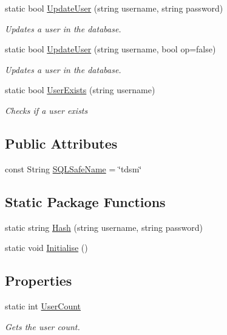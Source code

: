 \begin{DoxyCompactItemize}
static bool \hyperlink{classOTA_1_1Data_1_1AuthenticatedUsers_a8daa0f5fae480dc1204ccdbdf1f8f69c}{Update\+User} (string username, string password)
\begin{DoxyCompactList}\small\item\em Updates a user in the database. \end{DoxyCompactList}\item 
static bool \hyperlink{classOTA_1_1Data_1_1AuthenticatedUsers_a346321073b07beb37d20b56431430243}{Update\+User} (string username, bool op=false)
\begin{DoxyCompactList}\small\item\em Updates a user in the database. \end{DoxyCompactList}\item 
static bool \hyperlink{classOTA_1_1Data_1_1AuthenticatedUsers_ae8fc38c260677286cd40298aa4c6e0bd}{User\+Exists} (string username)
\begin{DoxyCompactList}\small\item\em Checks if a user exists \end{DoxyCompactList}\end{DoxyCompactItemize}
\subsection*{Public Attributes}
\begin{DoxyCompactItemize}
\item 
const String \hyperlink{classOTA_1_1Data_1_1AuthenticatedUsers_a5f7b801a55ee829062b5878a70c905b4}{S\+Q\+L\+Safe\+Name} = \char`\"{}tdsm\char`\"{}
\end{DoxyCompactItemize}
\subsection*{Static Package Functions}
\begin{DoxyCompactItemize}
\item 
static string \hyperlink{classOTA_1_1Data_1_1AuthenticatedUsers_a2057234b02c94f3b139dd20654e3d789}{Hash} (string username, string password)
\item 
static void \hyperlink{classOTA_1_1Data_1_1AuthenticatedUsers_a313d283897b7cb30f0890a56ce2a505d}{Initialise} ()
\end{DoxyCompactItemize}
\subsection*{Properties}
\begin{DoxyCompactItemize}
\item 
static int \hyperlink{classOTA_1_1Data_1_1AuthenticatedUsers_a64d91039c6988ac6df2413447a5caa6b}{User\+Count}
\begin{DoxyCompactList}\small\item\em Gets the user count. \end{DoxyCompactList}\end{DoxyCompactItemize}


